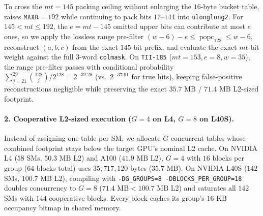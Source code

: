 \documentclass[11pt,a4paper]{article}
\begin{document}
To cross the $mt=145$ packing ceiling without enlarging the $16$-byte bucket table,  raises $\texttt{MAXR}=192$ while continuing to pack bits $17\text{--}144$ into \texttt{ulonglong2}. For $145 < mt \le 192$, the $e = mt - 145$ omitted upper bits can contribute at most $e$ ones, so we apply the lossless range pre-filter $(w-6)-e \le \operatorname{popc}_{128} \le w-6$, reconstruct $(a, b, c)$ from the exact $145$-bit prefix, and evaluate the exact $mt$-bit weight against the full $3$-word \texttt{colmask}. On \texttt{TII-185} ($mt=153, e=8, w=35$), the range pre-filter passes with conditional probability $\sum_{j=21}^{29}\binom{128}{j}/2^{128} = 2^{-32.28}$ (vs.\ $2^{-37.91}$ for true hits), keeping false-positive reconstructions negligible while preserving the exact $35.7\text{ MB}$ / $71.4\text{ MB}$ L2-sized footprint.

\paragraph{2. Cooperative L2-sized execution ($G=4$ on L4, $G=8$ on L40S).}
Instead of assigning one table per SM, we allocate $G$ concurrent tables whose combined footprint stays below the target GPU's nominal L2 cache. On NVIDIA L4 ($58$ SMs, $50.3\text{ MB}$ L2) and A100 ($41.9\text{ MB}$ L2), $G=4$ with $16$ blocks per group ($64$ blocks total) uses $35{,}717{,}120$ bytes ($35.7\text{ MB}$). On NVIDIA L40S ($142$ SMs, $100.7\text{ MB}$ L2), compiling with \texttt{-DG\_GROUPS=8 -DBLOCKS\_PER\_GROUP=18} doubles concurrency to $G=8$ ($71.4\text{ MB} < 100.7\text{ MB}$ L2) and saturates all $142$ SMs with $144$ cooperative blocks. Every block caches its group's $16\text{ KB}$ occupancy bitmap in shared memory.
\end{document}
